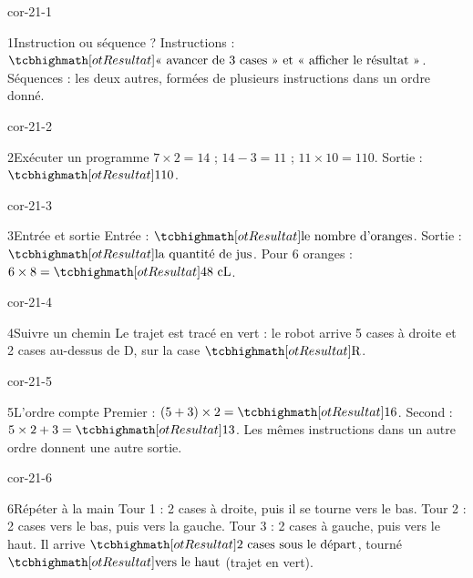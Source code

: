 \clearpage\pagestyle{otMain}\setlength{\otBlocEspacement}{2.5mm}\fontsize{11}{15}\selectfont{}
\begin{blocLivre}{cor-21-1}\begin{corrige}{1}{Instruction ou séquence ?}
Instructions : $\res{\text{« avancer de 3 cases » et « afficher le résultat »}}$. Séquences : les deux autres, formées de plusieurs instructions dans un ordre donné.
\end{corrige}\end{blocLivre}
\begin{blocLivre}{cor-21-2}\begin{corrige}{2}{Exécuter un programme}
$7\times2=14$ ; $14-3=11$ ; $11\times10=110$. Sortie : $\res{110}$.
\label{fig-cor-21-2}
\end{corrige}\end{blocLivre}
\begin{blocLivre}{cor-21-3}\begin{corrige}{3}{Entrée et sortie}
Entrée : $\res{\text{le nombre d’oranges}}$. Sortie : $\res{\text{la quantité de jus}}$. Pour 6 oranges : $6\times8=\res{48\ \mathrm{cL}}$.
\end{corrige}\end{blocLivre}
\begin{blocLivre}{cor-21-4}\begin{corrige}{4}{Suivre un chemin}
Le trajet est tracé en vert : le robot arrive 5 cases à droite et 2 cases au-dessus de D, sur la case $\res{\text{R}}$.
\label{fig-cor-21-4}
\end{corrige}\end{blocLivre}
\begin{blocLivre}{cor-21-5}\begin{corrige}{5}{L’ordre compte}
Premier : $(5+3)\times2=\res{16}$. Second : $5\times2+3=\res{13}$. Les mêmes instructions dans un autre ordre donnent une autre sortie.
\end{corrige}\end{blocLivre}
\begin{blocLivre}{cor-21-6}\begin{corrige}{6}{Répéter à la main}
Tour 1 : 2 cases à droite, puis il se tourne vers le bas. Tour 2 : 2 cases vers le bas, puis vers la gauche. Tour 3 : 2 cases à gauche, puis vers le haut. Il arrive $\res{2\text{ cases sous le départ}}$, tourné $\res{\text{vers le haut}}$ (trajet en vert).
\label{fig-cor-21-6}
\end{corrige}\end{blocLivre}
